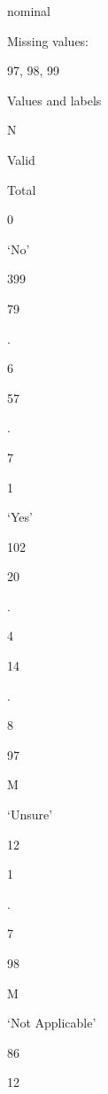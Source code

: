 \documentclass[
  letterpaper,
]{scrbook}
\begin{document}
\begin{enumerate}
\begin{enumerate}
\begin{enumerate}
\begin{enumerate}
\begin{enumerate}
\begin{enumerate}
\begin{enumerate}
\begin{enumerate}
\begin{enumerate}
\begin{enumerate}
\begin{enumerate}
\begin{enumerate}
\begin{enumerate}
                          nominal

                          Missing values:

                          97, 98, 99

                          Values and labels

                          N

                          Valid

                          Total

                          0

                          `No'

                          399

                          79

                          .

                          6

                          57

                          .

                          7

                          1

                          `Yes'

                          102

                          20

                          .

                          4

                          14

                          .

                          8

                          97

                          M

                          `Unsure'

                          12

                          1

                          .

                          7

                          98

                          M

                          `Not Applicable'

                          86

                          12


\end{enumerate}
\end{enumerate}
\end{enumerate}
\end{enumerate}
\end{enumerate}
\end{enumerate}
\end{enumerate}
\end{enumerate}
\end{enumerate}
\end{enumerate}
\end{enumerate}
\end{enumerate}
\end{enumerate}
\end{document}
